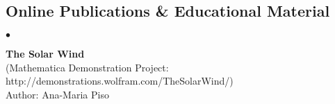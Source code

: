 \documentclass[margin,line]{res}
\newenvironment{list1}{
  \begin{list}{\ding{113}}{%
      \setlength{\itemsep}{0in}
      \setlength{\parsep}{0in} \setlength{\parskip}{0in}
      \setlength{\topsep}{0in} \setlength{\partopsep}{0in} 
      \setlength{\leftmargin}{0.17in}}}{\end{list}}
\newenvironment{list2}{
  \begin{list}{$\bullet$}{%
      \setlength{\itemsep}{0in}
      \setlength{\parsep}{0in} \setlength{\parskip}{0in}
      \setlength{\topsep}{0in} \setlength{\partopsep}{0in} 
      \setlength{\leftmargin}{0.2in}}}{\end{list}}
\begin{document}
\begin{resume}







%


\section{\sc Online Publications \& Educational Material}

\begin{list2}
\item[] {\bf The Solar Wind} \\
(Mathematica Demonstration Project: http://demonstrations.wolfram.com/TheSolarWind/) \\
Author: Ana-Maria Piso \\
\end{list2}


\end{resume}
\end{document}
